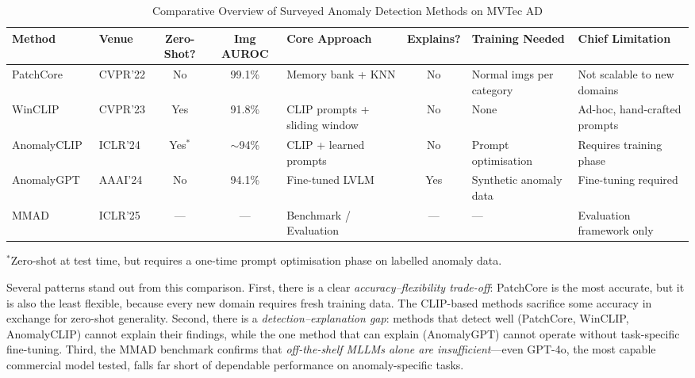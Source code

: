 \documentclass[conference]{IEEEtran}
\begin{document}
\begin{table}[t]
\centering
\caption{Comparative Overview of Surveyed Anomaly Detection Methods on MVTec AD}
\label{tab:comparison}
\renewcommand{\arraystretch}{1.4}
\begin{tabular}{|p{2.2cm}|p{1.3cm}|c|c|p{2.4cm}|c|p{1.8cm}|p{2.5cm}|}
\hline
\textbf{Method} & \textbf{Venue} & \textbf{Zero-Shot?} & \textbf{Img AUROC} & \textbf{Core Approach} & \textbf{Explains?} & \textbf{Training Needed} & \textbf{Chief Limitation} \\
\hline\hline
PatchCore~\cite{roth2022patchcore} & CVPR'22 & No & 99.1\% & Memory bank + KNN & No & Normal imgs per category & Not scalable to new domains \\
\hline
WinCLIP~\cite{jeong2023winclip} & CVPR'23 & Yes & 91.8\% & CLIP prompts + sliding window & No & None & Ad-hoc, hand-crafted prompts \\
\hline
AnomalyCLIP~\cite{zhou2024anomalyclip} & ICLR'24 & Yes$^*$ & $\sim$94\% & CLIP + learned prompts & No & Prompt optimisation & Requires training phase \\
\hline
AnomalyGPT~\cite{gu2024anomalygpt} & AAAI'24 & No & 94.1\% & Fine-tuned LVLM & Yes & Synthetic anomaly data & Fine-tuning required \\
\hline
MMAD~\cite{jiang2025mmad} & ICLR'25 & --- & --- & Benchmark / Evaluation & --- & --- & Evaluation framework only \\
\hline
\end{tabular}
\vspace{1mm}

\footnotesize{$^*$Zero-shot at test time, but requires a one-time prompt optimisation phase on labelled anomaly data.}
\end{table}

Several patterns stand out from this comparison. First, there is a clear \textit{accuracy--flexibility trade-off}: PatchCore is the most accurate, but it is also the least flexible, because every new domain requires fresh training data. The CLIP-based methods sacrifice some accuracy in exchange for zero-shot generality. Second, there is a \textit{detection--explanation gap}: methods that detect well (PatchCore, WinCLIP, AnomalyCLIP) cannot explain their findings, while the one method that can explain (AnomalyGPT) cannot operate without task-specific fine-tuning. Third, the MMAD benchmark confirms that \textit{off-the-shelf MLLMs alone are insufficient}---even GPT-4o, the most capable commercial model tested, falls far short of dependable performance on anomaly-specific tasks.
\end{document}
